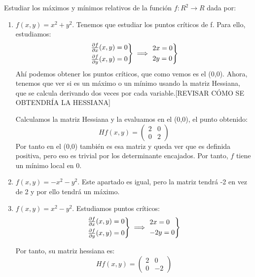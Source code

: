 \begin{ejer}
	Estudiar los máximos y mínimos relativos de la función $f: R^2 \to R$ dada por:
	\begin{enumerate}

	\item $f(x,y)=x^2+y^2$. Tenemos que estudiar los puntos críticos de f. Para ello, estudiamos:
	\[
	\begin{rcases}
	\frac{\partial f}{\partial x}(x,y) = 0\\
	\frac{\partial f}{\partial y}(x,y) = 0
\end{rcases} \implies \begin{rcases}
	2x= 0\\
	2y = 0\\
\end{rcases}
	\]
	Ahí podemos obtener los puntos críticos, que como vemos es el (0,0). Ahora, tenemos que ver si es un máximo o un mínimo usando la matriz Hessiana, que se calcula derivando dos veces por cada variable.[REVISAR CÓMO SE OBTENDRÍA LA HESSIANA]

	Calculamos la matriz Hessiana y la evaluamos en el (0,0), el punto obtenido:
	\[
	Hf(x,y) = \begin{pmatrix} 2 & 0 \\ 0 & 2 \end{pmatrix}
	\]
	Por tanto en el (0,0) también es esa matriz y queda ver que es definida positiva, pero eso es trivial por los determinante encajados. Por tanto, $f$ tiene un mínimo local en 0.

	\item $f(x,y) = -x^2-y^2$. Este apartado es igual, pero la matriz tendrá -2 en vez de 2 y por ello tendrá un máximo.

	\item $f(x,y) = x^2-y^2$. Estudiamos puntos críticos:
	\[
	\begin{rcases}
	\frac{\partial f}{\partial x}(x,y) = 0\\
	\frac{\partial f}{\partial y}(x,y) = 0
\end{rcases} \implies \begin{rcases}
	2x= 0\\
	-2y = 0\\
\end{rcases}
	\]

	Por tanto, su matriz hessiana es:
		\[
	Hf(x,y) = \begin{pmatrix} 2 & 0 \\ 0 & -2 \end{pmatrix}
	\]


\end{enumerate}
\end{ejer}
